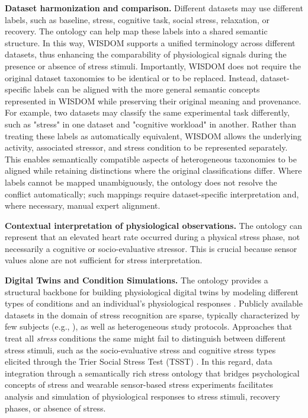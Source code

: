 \documentclass[
]{ceurart}
\begin{document}
\textbf{Dataset harmonization and comparison.}
Different datasets may use different labels, such as baseline, stress, cognitive task, social stress, relaxation, or recovery. The ontology can help map these labels into a shared semantic structure. In this way, WISDOM supports a unified terminology across different datasets, thus enhancing the comparability of physiological signals during the presence or absence of stress stimuli.
Importantly, WISDOM does not require the original dataset taxonomies to be identical or to be replaced. Instead, dataset-specific labels can be aligned with the more general semantic concepts represented in WISDOM while preserving their original meaning and provenance. For example, two datasets may classify the same experimental task differently, such as "stress" in one dataset and "cognitive workload" in another. Rather than treating these labels as automatically equivalent, WISDOM allows the underlying activity, associated stressor, and stress condition to be represented separately. This enables semantically compatible aspects of heterogeneous taxonomies to be aligned while retaining distinctions where the original classifications differ. Where labels cannot be mapped unambiguously, the ontology does not resolve the conflict automatically; such mappings require dataset-specific interpretation and, where necessary, manual expert alignment. 

\textbf{Contextual interpretation of physiological observations.} 
The ontology can represent that an elevated heart rate occurred during a physical stress phase, not necessarily a cognitive or socio-evaluative stressor. This is crucial because sensor values alone are not sufficient for stress interpretation.

\textbf{Digital Twins and Condition Simulations.}
The ontology provides a structural backbone for building physiological digital twins by modeling different types of conditions and an individual's physiological responses \cite{CinarDDT2026}. Publicly available datasets in the domain of stress recognition are sparse, typically characterized by few subjects (e.g., \cite{schmidt2018introducing, birjandtalab2016non}), as well as heterogeneous study protocols. Approaches that treat all \textit{stress} conditions the same might fail to distinguish between different stress stimuli, such as the socio-evaluative stress and cognitive stress types elicited through the Trier Social Stress Test (TSST) \cite{kirschbaum1993trier}. In this regard, data integration through a semantically rich stress ontology that bridges psychological concepts of stress and wearable sensor-based stress experiments facilitates analysis and simulation of physiological responses to stress stimuli, recovery phases, or absence of stress. 
\end{document}
